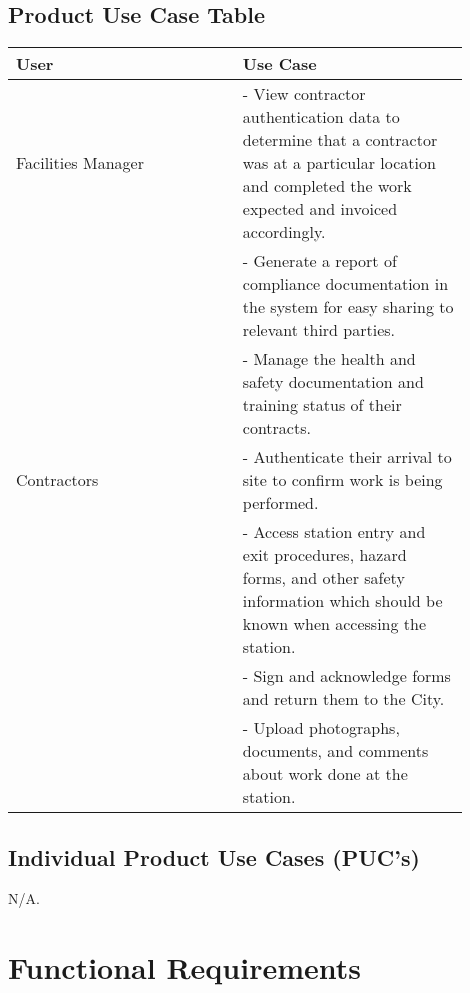 \documentclass[12pt]{article}
\begin{document}
\subsection{Product Use Case Table}

\begin{tabular}{|p{0.45\linewidth}|p{0.45\linewidth}|}
\hline
\textbf{User}& \textbf{Use Case} \\ 
\hline
Facilities Manager & - View contractor authentication data to determine that
a contractor was at a particular location and completed the work expected
and invoiced accordingly. \\
& - Generate a report of compliance documentation in the system for easy
sharing to relevant third parties. \\
& - Manage the health and safety documentation and training status of
their contracts.\\
\hline
Contractors & - Authenticate their arrival to site to confirm work is being
performed.\\
& - Access station entry and exit procedures, hazard forms, and other safety
information which should be known when accessing the station.\\
& - Sign and acknowledge forms and return them to the City.\\
& - Upload photographs, documents, and comments about work done at the station. \\
\hline
\end{tabular}

\subsection{Individual Product Use Cases (PUC's)}
N/A.
\section{Functional Requirements}
\end{document}
